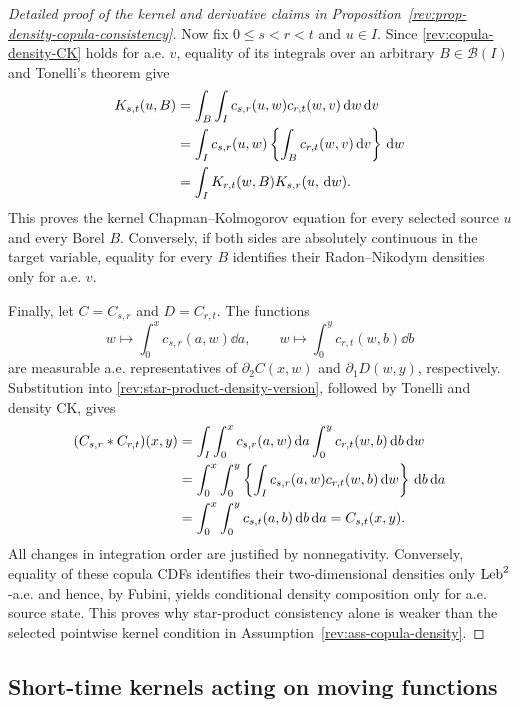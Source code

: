 \begin{proof}[Detailed proof of the kernel and derivative claims in
Proposition~\ref{rev:prop-density-copula-consistency}]
Now fix $0\le s<r<t$ and $u\in I$.  Since
\eqref{rev:copula-density-CK} holds for a.e. $v$, equality of its integrals over
an arbitrary $B\in\mathcal B(I)$ and Tonelli's theorem give
\begin{align}
K_{s,t}(u,B)
&=\int_B\int_Ic_{s,r}(u,w)c_{r,t}(w,v)\,\mathrm d w\,\mathrm d v\notag\\
&=\int_Ic_{s,r}(u,w)
       \left\{\int_Bc_{r,t}(w,v)\,\mathrm d v\right\}\,\mathrm d w\notag\\
&=\int_IK_{r,t}(w,B)K_{s,r}(u,\,\mathrm d w).
\label{rev:app-density-to-kernel-CK}
\end{align}
This proves the kernel Chapman--Kolmogorov equation for every selected source
$u$ and every Borel $B$.  Conversely, if both sides are absolutely continuous
in the target variable, equality for every $B$ identifies their
Radon--Nikodym densities only for a.e. $v$.

Finally, let $C=C_{s,r}$ and $D=C_{r,t}$.  The functions
\[
w\longmapsto\int_0^xc_{s,r}(a,w)\dd a,
\qquad
w\longmapsto\int_0^yc_{r,t}(w,b)\dd b
\]
are measurable a.e. representatives of $\partial_2C(x,w)$ and
$\partial_1D(w,y)$, respectively.  Substitution into
\eqref{rev:star-product-density-version}, followed by Tonelli and density CK,
gives
\begin{align}
(C_{s,r}*C_{r,t})(x,y)
&=\int_I\int_0^xc_{s,r}(a,w)\,\mathrm d a
             \int_0^yc_{r,t}(w,b)\,\mathrm d b\,\mathrm d w\notag\\
&=\int_0^x\int_0^y
     \left\{\int_Ic_{s,r}(a,w)c_{r,t}(w,b)\,\mathrm d w\right\}\,\mathrm d b\,\mathrm d a\notag\\
&=\int_0^x\int_0^yc_{s,t}(a,b)\,\mathrm d b\,\mathrm d a
=C_{s,t}(x,y).
\label{rev:app-star-product-integral}
\end{align}
All changes in integration order are justified by nonnegativity.  Conversely,
equality of these copula CDFs identifies their two-dimensional densities only
$\operatorname{Leb}^2$-a.e. and hence, by Fubini, yields conditional density composition only
for a.e. source state.  This proves why star-product consistency alone is weaker
than the selected pointwise kernel condition in
Assumption~\ref{rev:ass-copula-density}.
\end{proof}

\subsection{Short-time kernels acting on moving functions}

